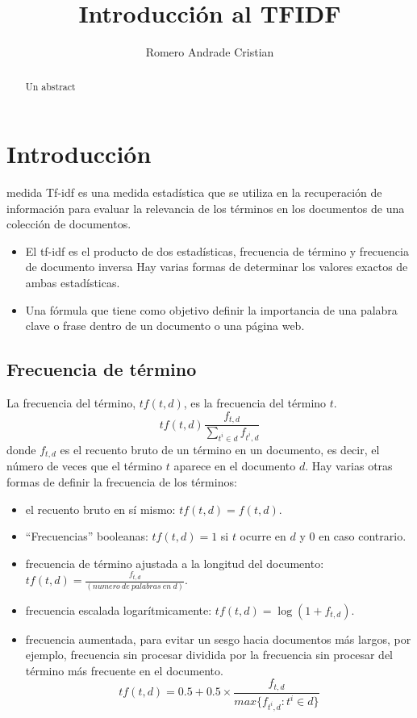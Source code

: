 \documentclass{IEEEtran}
\begin{document}
\title{Introducción al TFIDF}
\author{Romero Andrade Cristian}
\maketitle{}

\begin{abstract}
  Un abstract
\end{abstract}

\section{Introducción}\label{sec:introduccion}
 medida Tf-idf  es una medida estadística que se utiliza
en la recuperación de información para evaluar la relevancia de los términos en
los documentos de una colección de documentos.

\begin{itemize}
  \item El tf-idf es el producto de dos estadísticas, frecuencia de término y frecuencia de documento inversa
        Hay varias formas de determinar los valores exactos de ambas estadísticas.
  \item Una fórmula que tiene como objetivo definir la importancia de una palabra clave o frase dentro de un documento o una página web.
\end{itemize}

\subsection{Frecuencia de término}\label{sec:frec-de-term}
La frecuencia del término, $tf(t, d)$, es la frecuencia del término $t$.
\[ tf(t,d)\frac{f_{t,d}}{\sum_{t^{i}\in d}f_{t^{i}, d}}\]
donde $f_{t, d}$ es el recuento bruto de un término en un documento, es decir,
el número de veces que el término $t$ aparece en el documento $d$.
Hay varias otras formas de definir la frecuencia de los términos:
\begin{itemize}
  \item el recuento bruto en sí mismo: $tf(t, d) = f(t, d)$.
  \item ``Frecuencias'' booleanas: $tf(t, d ) = 1$ si $t$ ocurre en $d$ y $0$ en caso
        contrario.
  \item frecuencia de término ajustada a la longitud del documento:
        $tf(t, d) = \frac{f_{t, d}}{(numero\ de\ palabras\ en\ d)}$.
  \item frecuencia escalada logarítmicamente: $tf(t, d) = \log{(1 + f_{ t , d})}$.
  \item frecuencia aumentada, para evitar un sesgo hacia documentos más largos,
        por ejemplo, frecuencia sin procesar dividida por la frecuencia sin
        procesar del término más frecuente en el documento.
        \[ tf(t,d)=0.5+0.5 \times \frac{f_{t, d}}{max\{f_{t^{i}, d}: t^{i} \in d\}} \]
\end{itemize}
\end{document}
